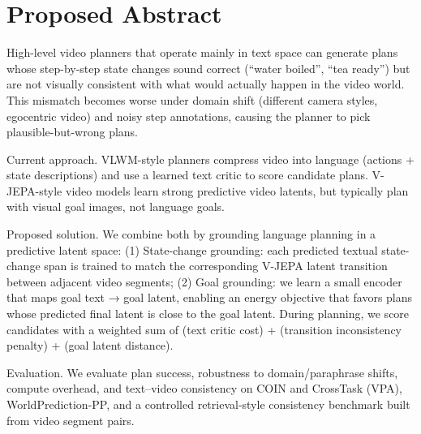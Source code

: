 \section*{Proposed Abstract}

High-level video planners that operate mainly in text space can generate plans whose step-by-step state changes sound correct (“water boiled”, “tea ready”) but are not visually consistent with what would actually happen in the video world. This mismatch becomes worse under domain shift (different camera styles, egocentric video) and noisy step annotations, causing the planner to pick plausible-but-wrong plans.

Current approach. VLWM-style planners compress video into language (actions + state descriptions) and use a learned text critic to score candidate plans. V-JEPA-style video models learn strong predictive video latents, but typically plan with visual goal images, not language goals.

Proposed solution. We combine both by grounding language planning in a predictive latent space: (1) State-change grounding: each predicted textual state-change span is trained to match the corresponding V-JEPA latent transition between adjacent video segments; (2) Goal grounding: we learn a small encoder that maps goal text → goal latent, enabling an energy objective that favors plans whose predicted final latent is close to the goal latent. During planning, we score candidates with a weighted sum of (text critic cost) + (transition inconsistency penalty) + (goal latent distance).

Evaluation. We evaluate plan success, robustness to domain/paraphrase shifts, compute overhead, and text–video consistency on COIN and CrossTask (VPA), WorldPrediction-PP, and a controlled retrieval-style consistency benchmark built from video segment pairs.
